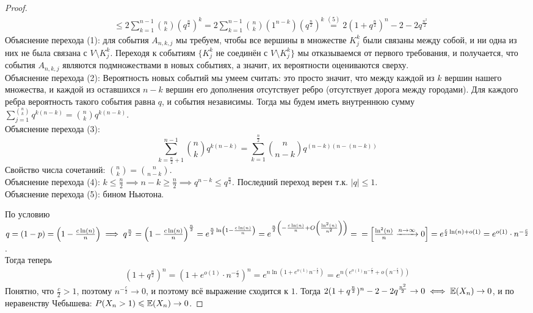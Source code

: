 \begin{proof}
\begin{align*}
        & \leq 2\sum\limits_{k = 1}^{n - 1} \binom{n}{k} \left(q^{\frac{n}{2}}\right)^k =
        2\sum\limits_{k = 1}^{n - 1} \binom{n}{k} (1^{n - k}) \left(q^{\frac{n}{2}}\right)^k
        \overset{(5)}{=} 2(1 + q^{\frac{n}{2}})^n - 2 - 2q^{\frac{n^2}{2}}
    \end{align*}
    Объяснение перехода (1): для события $A_{n, k, j}$ мы требуем, чтобы все вершины в множестве $K^k_j$
    были связаны между собой, и ни одна из них не была связана с $V \setminus K^k_j$. Переходя к событиям
    $\{ K^k_j \text{ не соединён с } V \setminus K^k_j \}$ мы отказываемся от первого требования, и получается,
    что события $A_{n, k, j}$ являются подмножествами в новых событиях, а значит, их вероятности оцениваются
    сверху.\\
    Объяснение перехода (2): Вероятность новых событий мы умеем считать: это просто значит, что между каждой
    из $k$ вершин нашего множества, и каждой из оставшихся $n - k$ вершин его дополнения отсутствует ребро
    (отсутствует дорога между городами). Для каждого ребра вероятность такого события равна $q$, и события
    независимы. Тогда мы будем иметь внутреннюю сумму $\sum\limits_{j = 1}^{\binom{n}{k}} q^{k(n - k)} =
    \binom{n}{k} q^{k(n - k)}$.\\
    Объяснение перехода (3):
    \[
        \sum\limits_{k = \frac{n}{2} + 1}^{n - 1} \binom{n}{k} q^{k(n - k)} =
        \sum\limits_{k = 1}^{\frac{n}{2}} \binom{n}{n - k} q^{(n - k)(n - (n - k))}
    \]
    Свойство числа сочетаний: $\binom{n}{k} = \binom{n}{n - k}$.\\
    Объяснение перехода (4): $k \leq \frac{n}{2} \implies n - k \geq \frac{n}{2} \implies
    q^{n - k} \leq q^{\frac{n}{2}}$. Последний переход верен т.к. $|q| \leq 1$.\\
    Объяснение перехода (5): бином Ньютона.

    По условию $q = (1 - p) = \left( 1 - \frac{c\ln(n)}{n} \right) \implies q^{\frac{n}{2}} =
    \left( 1 - \frac{c\ln(n)}{n} \right)^{\frac{n}{2}} = e^{\frac{n}{2}\ln\left( 1 - \frac{c\ln(n)}{n} \right)}
    =e^{\frac{n}{2}\left( -\frac{c\ln(n)}{n} + O\left( \frac{\ln^2(n)}{n^2} \right) \right)} =\\
    =
    \left[
    \frac{\ln^2(n)}{n} \xrightarrow{n \to \infty} 0
    \right]
    =e^{\frac{c}{2}\ln(n) + o(1)} = e^{o(1)} \cdot n^{-\frac{c}{2}}$.\\
    Тогда теперь
    \begin{align*}
        (1 + q^{\frac{n}{2}})^n = (1 + e^{o(1)} \cdot n^{-\frac{c}{2}})^n =
        e^{n\ln\left( 1 + e^{o(1)}n^{-\frac{c}{2}} \right)} =
        e^{n\left(e^{o(1)}n^{-\frac{c}{2}} + o\left( n^{-\frac{c}{2}} \right) \right)}
    \end{align*}
    Понятно, что $\frac{c}{2} > 1$, поэтому $n^{-\frac{c}{2}} \to 0$, и поэтому всё выражение сходится к $1$.
    Тогда $2(1 + q^{\frac{n}{2}})^n - 2 - 2q^{\frac{n^2}{2}} \to 0 \iff \mathbb{E}(X_n) \to 0$,
    и по неравенству Чебышева: $P(X_n > 1) \leqslant \mathbb{E}(X_n) \to 0$.
\end{proof}